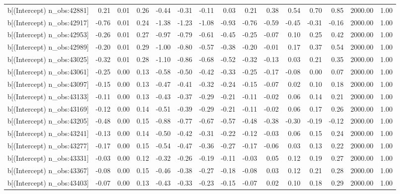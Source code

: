 \begin{table}[ht]
\begin{tabular}{rrrrrrrrrrrrrrr}
  b[(Intercept) n\_obs:42881] & 0.21 & 0.01 & 0.26 & -0.44 & -0.31 & -0.11 & 0.03 & 0.21 & 0.38 & 0.54 & 0.70 & 0.85 & 2000.00 & 1.00 \\ 
  b[(Intercept) n\_obs:42917] & -0.76 & 0.01 & 0.24 & -1.38 & -1.23 & -1.08 & -0.93 & -0.76 & -0.59 & -0.45 & -0.31 & -0.16 & 2000.00 & 1.00 \\ 
  b[(Intercept) n\_obs:42953] & -0.26 & 0.01 & 0.27 & -0.97 & -0.79 & -0.61 & -0.45 & -0.25 & -0.07 & 0.10 & 0.25 & 0.42 & 2000.00 & 1.00 \\ 
  b[(Intercept) n\_obs:42989] & -0.20 & 0.01 & 0.29 & -1.00 & -0.80 & -0.57 & -0.38 & -0.20 & -0.01 & 0.17 & 0.37 & 0.54 & 2000.00 & 1.00 \\ 
  b[(Intercept) n\_obs:43025] & -0.32 & 0.01 & 0.28 & -1.10 & -0.86 & -0.68 & -0.52 & -0.32 & -0.13 & 0.03 & 0.21 & 0.35 & 2000.00 & 1.00 \\ 
  b[(Intercept) n\_obs:43061] & -0.25 & 0.00 & 0.13 & -0.58 & -0.50 & -0.42 & -0.33 & -0.25 & -0.17 & -0.08 & 0.00 & 0.07 & 2000.00 & 1.00 \\ 
  b[(Intercept) n\_obs:43097] & -0.15 & 0.00 & 0.13 & -0.47 & -0.41 & -0.32 & -0.24 & -0.15 & -0.07 & 0.02 & 0.10 & 0.18 & 2000.00 & 1.00 \\ 
  b[(Intercept) n\_obs:43133] & -0.11 & 0.00 & 0.13 & -0.43 & -0.37 & -0.29 & -0.21 & -0.11 & -0.02 & 0.06 & 0.14 & 0.21 & 2000.00 & 1.00 \\ 
  b[(Intercept) n\_obs:43169] & -0.12 & 0.00 & 0.14 & -0.51 & -0.39 & -0.29 & -0.21 & -0.11 & -0.02 & 0.06 & 0.17 & 0.26 & 2000.00 & 1.00 \\ 
  b[(Intercept) n\_obs:43205] & -0.48 & 0.00 & 0.15 & -0.88 & -0.77 & -0.67 & -0.57 & -0.48 & -0.38 & -0.30 & -0.19 & -0.12 & 2000.00 & 1.00 \\ 
  b[(Intercept) n\_obs:43241] & -0.13 & 0.00 & 0.14 & -0.50 & -0.42 & -0.31 & -0.22 & -0.12 & -0.03 & 0.06 & 0.15 & 0.24 & 2000.00 & 1.00 \\ 
  b[(Intercept) n\_obs:43277] & -0.17 & 0.00 & 0.15 & -0.54 & -0.47 & -0.36 & -0.27 & -0.17 & -0.06 & 0.03 & 0.13 & 0.22 & 2000.00 & 1.00 \\ 
  b[(Intercept) n\_obs:43331] & -0.03 & 0.00 & 0.12 & -0.32 & -0.26 & -0.19 & -0.11 & -0.03 & 0.05 & 0.12 & 0.19 & 0.27 & 2000.00 & 1.00 \\ 
  b[(Intercept) n\_obs:43367] & -0.08 & 0.00 & 0.15 & -0.46 & -0.38 & -0.27 & -0.18 & -0.08 & 0.03 & 0.12 & 0.21 & 0.28 & 2000.00 & 1.00 \\ 
  b[(Intercept) n\_obs:43403] & -0.07 & 0.00 & 0.13 & -0.43 & -0.33 & -0.23 & -0.15 & -0.07 & 0.02 & 0.10 & 0.18 & 0.29 & 2000.00 & 1.00 \\ 

\end{tabular}
\end{table}
